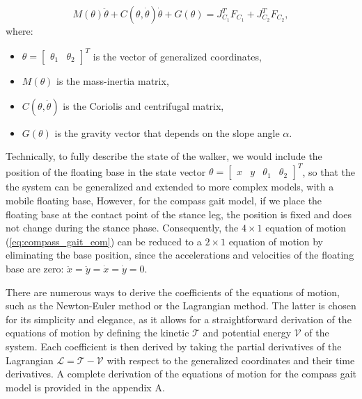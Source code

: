 \begin{equation}\label{eq:compass_gait_eom}
    M(\theta)\ddot{\theta} + C(\theta, \dot{\theta})\dot{\theta} + G(\theta) = J_{C_1}^T F_{C_1} + J_{C_2}^T F_{C_2},
\end{equation}
where:

\begin{itemize}
    \item $\theta = \begin{bmatrix}
        \theta_1 & \theta_2
    \end{bmatrix}^T$ is the vector of generalized coordinates,
    \item $M(\theta)$ is the mass-inertia matrix,
    \item $C(\theta, \dot{\theta})$ is the Coriolis and centrifugal matrix,
    \item $G(\theta)$ is the gravity vector that depends on the slope angle $\alpha$.
\end{itemize}

Technically, to fully describe the state of the walker, we would include the position of the floating base in the state vector
$\theta = \begin{bmatrix}
    x & y & \theta_1 & \theta_2
\end{bmatrix}^T$, so that the the system can be generalized and extended to more complex models, with a mobile floating base,
However, for the compass gait model, if we place the floating base at the contact point of the stance leg, the position is fixed and does not change during the stance phase.
Consequently, the $4\times1$ equation of motion (\ref{eq:compass_gait_eom}) can be reduced to a $2\times1$ equation of motion by eliminating the base position, since the accelerations and velocities of the floating base are zero: $\ddot{x} = \ddot{y} = \dot{x} = \dot{y} = 0$.

There are numerous ways to derive the coefficients of the equations of motion, such as the Newton-Euler method or the Lagrangian method.
The latter is chosen for its simplicity and elegance, as it allows for a straightforward derivation of the equations of motion by defining the kinetic $\mathcal{T}$ and potential energy $\mathcal{V}$ of the system. 
Each coefficient is then derived by taking the partial derivatives of the Lagrangian $\mathcal{L} = \mathcal{T} - \mathcal{V}$ with respect to the generalized coordinates and their time derivatives.
A complete derivation of the equations of motion for the compass gait model is provided in the appendix A. %

